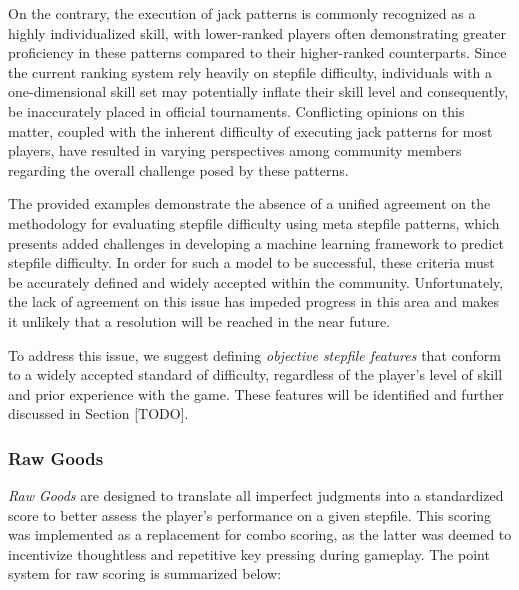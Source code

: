 \vspace{2mm}

On the contrary, the execution of jack patterns is commonly recognized as a highly individualized skill, with lower-ranked players often demonstrating greater proficiency in these patterns compared to their higher-ranked counterparts. Since the current ranking system rely heavily on stepfile difficulty, individuals with a one-dimensional skill set may potentially inflate their skill level and consequently, be inaccurately placed in official tournaments. Conflicting opinions on this matter, coupled with the inherent difficulty of executing jack patterns for most players, have resulted in varying perspectives among community members regarding the overall challenge posed by these patterns.

\vspace{2mm}

The provided examples demonstrate the absence of a unified agreement on the methodology for evaluating stepfile difficulty using meta stepfile patterns, which presents added challenges in developing a machine learning framework to predict stepfile difficulty. In order for such a model to be successful, these criteria must be accurately defined and widely accepted within the community. Unfortunately, the lack of agreement on this issue has impeded progress in this area and makes it unlikely that a resolution will be reached in the near future.

\vspace{2mm}

To address this issue, we suggest defining \textit{objective stepfile features} that conform to a widely accepted standard of difficulty, regardless of the player's level of skill and prior experience with the game. These features will be identified and further discussed in Section [TODO].

\subsubsection{Raw Goods}

\textit{Raw Goods} are designed to translate all imperfect judgments into a standardized score to better assess the player's performance on a given stepfile. This scoring was implemented as a replacement for combo scoring, as the latter was deemed to incentivize thoughtless and repetitive key pressing during gameplay. The point system for raw scoring is summarized below:

